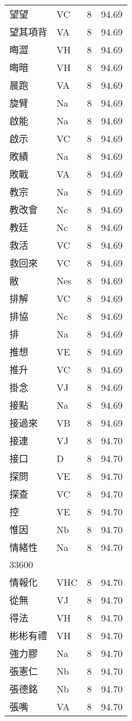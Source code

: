 \documentclass[twocolumn]{book}
\begin{document}
\begin{supertabular}{llrr}
望望 & VC & 8 &  94.69\\
望其項背 & VA & 8 &  94.69\\
晦澀 & VH & 8 &  94.69\\
晦暗 & VH & 8 &  94.69\\
晨跑 & VA & 8 &  94.69\\
旋臂 & Na & 8 &  94.69\\
啟能 & Na & 8 &  94.69\\
啟示 & VC & 8 &  94.69\\
敗績 & Na & 8 &  94.69\\
敗戰 & VA & 8 &  94.69\\
教宗 & Na & 8 &  94.69\\
教改會 & Nc & 8 &  94.69\\
教廷 & Nc & 8 &  94.69\\
救活 & VC & 8 &  94.69\\
救回來 & VC & 8 &  94.69\\
敝 & Nes & 8 &  94.69\\
排解 & VC & 8 &  94.69\\
排協 & Nc & 8 &  94.69\\
排 & Na & 8 &  94.69\\
推想 & VE & 8 &  94.69\\
推升 & VC & 8 &  94.69\\
掛念 & VJ & 8 &  94.69\\
接點 & Na & 8 &  94.69\\
接過來 & VB & 8 &  94.69\\
接連 & VJ & 8 &  94.70\\
接口 & D & 8 &  94.70\\
探問 & VE & 8 &  94.70\\
探查 & VC & 8 &  94.70\\
控 & VE & 8 &  94.70\\
惟因 & Nb & 8 &  94.70\\
情緒性 & Na & 8 &  94.70\\
33600\\
情報化 & VHC & 8 &  94.70\\
從無 & VJ & 8 &  94.70\\
得法 & VH & 8 &  94.70\\
彬彬有禮 & VH & 8 &  94.70\\
強力膠 & Na & 8 &  94.70\\
張憲仁 & Nb & 8 &  94.70\\
張德銘 & Nb & 8 &  94.70\\
張嘴 & VA & 8 &  94.70\\

\end{supertabular}
\end{document}

